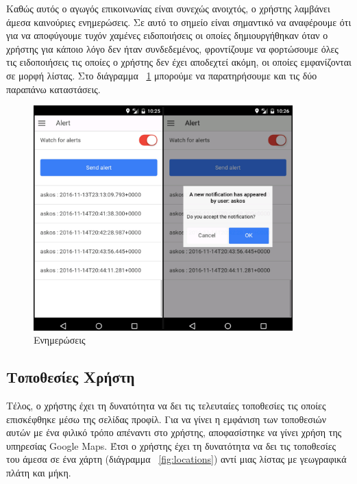 Καθώς αυτός ο αγωγός επικοινωνίας είναι συνεχώς ανοιχτός, ο χρήστης λαμβάνει άμεσα καινούριες ενημερώσεις. Σε αυτό το σημείο είναι σημαντικό να αναφέρουμε ότι για να αποφύγουμε τυχόν χαμένες ειδοποιήσεις οι οποίες δημιουργήθηκαν όταν ο χρήστης για κάποιο λόγο δεν ήταν συνδεδεμένος, φροντίζουμε να φορτώσουμε όλες τις ειδοποιήσεις τις οποίες ο χρήστης δεν έχει αποδεχτεί ακόμη, οι οποίες εμφανίζονται σε μορφή λίστας. Στο διάγραμμα ~\ref{fig:notifications} μπορούμε να παρατηρήσουμε και τις δύο παραπάνω καταστάσεις.   

\begin{figure}[h]
  \centering
  \includegraphics[width=100mm]{images/notifications.jpg}
  \caption{Ενημερώσεις}
  \label{fig:notifications}
\end{figure}

\newpage
\subsection{Τοποθεσίες Χρήστη}
Τέλος, ο χρήστης έχει τη δυνατότητα να δει τις τελευταίες τοποθεσίες τις οποίες επισκέφθηκε μέσω της σελίδας προφίλ. Για να γίνει η εμφάνιση των τοποθεσιών αυτών με ένα φιλικό τρόπο απέναντι στο χρήστης, αποφασίστηκε να γίνει χρήση της υπηρεσίας Google Maps. Έτσι ο χρήστης έχει τη δυνατότητα να δει τις τοποθεσίες του άμεσα σε ένα χάρτη (διάγραμμα ~\ref{fig:locations})  αντί μιας λίστας με γεωγραφικά πλάτη και μήκη.

